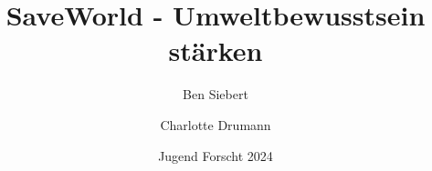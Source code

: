 \documentclass[12pt,a4paper]{article}
\begin{document}
    \selectfont

    \renewcommand{\baselinestretch}{1.50}\normalsize

    \title{SaveWorld - Umweltbewusstsein stärken}
    \author{Ben Siebert \and Charlotte Drumann}
    \date{Jugend Forscht 2024}
    \maketitle

    
\end{document}
